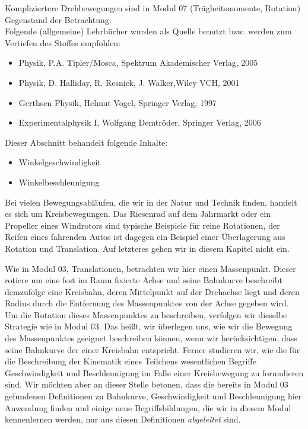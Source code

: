 \begin{MSectionStart}
Kompliziertere Drehbewegungen sind in Modul 07 (Tr\"agheitsmomente, Rotation) Gegenstand der Betrachtung. 
\ \\[0.5cm]

Folgende (allgemeine) Lehrb\"ucher wurden als Quelle benutzt bzw. werden zum Vertiefen des Stoffes empfohlen:  
\begin{itemize} 
\item Physik, P.A. Tipler/Mosca, Spektrum Akademischer Verlag, 2005
\item Physik, D. Halliday, R. Resnick, J. Walker,Wiley VCH, 2001
\item Gerthsen Physik, Helmut Vogel, Springer Verlag, 1997
\item Experimentalphysik I, Wolfgang Demtr\"oder, Springer Verlag, 2006
\end{itemize}

\end{MSectionStart}





\begin{MIntro}
Dieser Abschnitt behandelt folgende Inhalte:
\begin{itemize}
  \item{Winkelgeschwindigkeit}
  \item{Winkelbeschleunigung}
\end{itemize}


Bei vielen Bewegungsabl\"aufen, die wir in der Natur und Technik finden, handelt es sich um Kreisbewegungen. Das Riesenrad auf dem Jahrmarkt oder ein Propeller eines Windrotors sind typische Beispiele f\"ur reine Rotationen, der Reifen eines fahrenden Autos ist dagegen ein Beispiel einer \"Uberlagerung aus Rotation und Translation. Auf letzteres gehen wir in diesem Kapitel nicht ein.

Wie in Modul 03, Translationen, betrachten wir hier einen Massenpunkt. Dieser rotiere um eine fest im Raum fixierte Achse und seine Bahnkurve beschreibt demzufolge eine Kreisbahn, deren Mittelpunkt auf der Drehachse liegt und deren Radius durch die Entfernung des Massenpunktes von der Achse gegeben wird. Um die Rotation dieses Massenpunktes zu beschreiben, verfolgen wir dieselbe Strategie wie in Modul 03. Das hei{\ss}t, wir \"uberlegen uns, wie wir die Bewegung des Massenpunktes geeignet beschreiben k\"onnen, wenn wir ber\"ucksichtigen, dass seine Bahnkurve der einer Kreisbahn entspricht. Ferner studieren wir, wie die f\"ur die Beschreibung der Kinematik eines Teilchens wesentlichen Begriffe Geschwindigkeit und Beschleunigung im Falle einer Kreisbewegung zu formulieren sind. Wir m\"ochten aber an dieser Stelle betonen, dass die bereits in Modul 03 gefundenen Definitionen zu Bahnkurve, Geschwindigkeit und Beschleunigung hier Anwendung finden und einige neue Begriffsbildungen, die wir in diesem Modul kennenlernen werden, nur aus diesen Definitionen \emph{abgeleitet} sind.
\end{MIntro}

